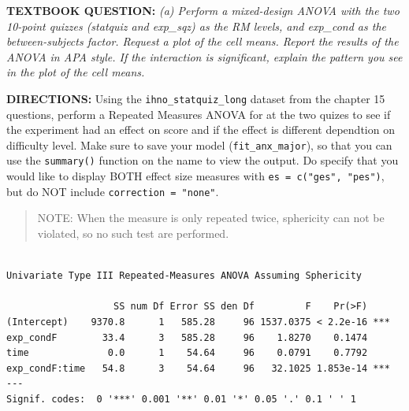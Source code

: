 \documentclass[]{article}
\newenvironment{Shaded}{\begin{snugshade}}{\end{snugshade}}
\newcommand{\KeywordTok}[1]{\textcolor[rgb]{0.13,0.29,0.53}{\textbf{#1}}}
\newcommand{\DataTypeTok}[1]{\textcolor[rgb]{0.13,0.29,0.53}{#1}}
\newcommand{\StringTok}[1]{\textcolor[rgb]{0.31,0.60,0.02}{#1}}
\newcommand{\CommentTok}[1]{\textcolor[rgb]{0.56,0.35,0.01}{\textit{#1}}}
\newcommand{\OperatorTok}[1]{\textcolor[rgb]{0.81,0.36,0.00}{\textbf{#1}}}
\newcommand{\NormalTok}[1]{#1}
\begin{document}
\textbf{TEXTBOOK QUESTION:} \emph{(a) Perform a mixed-design ANOVA with
the two 10-point quizzes (statquiz and exp\_sqz) as the RM levels, and
exp\_cond as the between-subjects factor. Request a plot of the cell
means. Report the results of the ANOVA in APA style. If the interaction
is significant, explain the pattern you see in the plot of the cell
means.}

\textbf{DIRECTIONS:} Using the \texttt{ihno\_statquiz\_long} dataset
from the chapter 15 questions, perform a Repeated Measures ANOVA for at
the two quizes to see if the experiment had an effect on score and if
the effect is different dependtion on difficulty level. Make sure to
save your model (\texttt{fit\_anx\_major}), so that you can use the
\texttt{summary()} function on the name to view the output. Do specify
that you would like to display BOTH effect size measures with
\texttt{es\ =\ c("ges",\ "pes")}, but do NOT include
\texttt{correction\ =\ "none"}.

\begin{quote}
NOTE: When the measure is only repeated twice, sphericity can not be
violated, so no such test are performed.
\end{quote}

\begin{Shaded}
\end{Shaded}

\begin{verbatim}

Univariate Type III Repeated-Measures ANOVA Assuming Sphericity

                   SS num Df Error SS den Df         F    Pr(>F)    
(Intercept)    9370.8      1   585.28     96 1537.0375 < 2.2e-16 ***
exp_condF        33.4      3   585.28     96    1.8270    0.1474    
time              0.0      1    54.64     96    0.0791    0.7792    
exp_condF:time   54.8      3    54.64     96   32.1025 1.853e-14 ***
---
Signif. codes:  0 '***' 0.001 '**' 0.01 '*' 0.05 '.' 0.1 ' ' 1
\end{verbatim}
\end{document}
